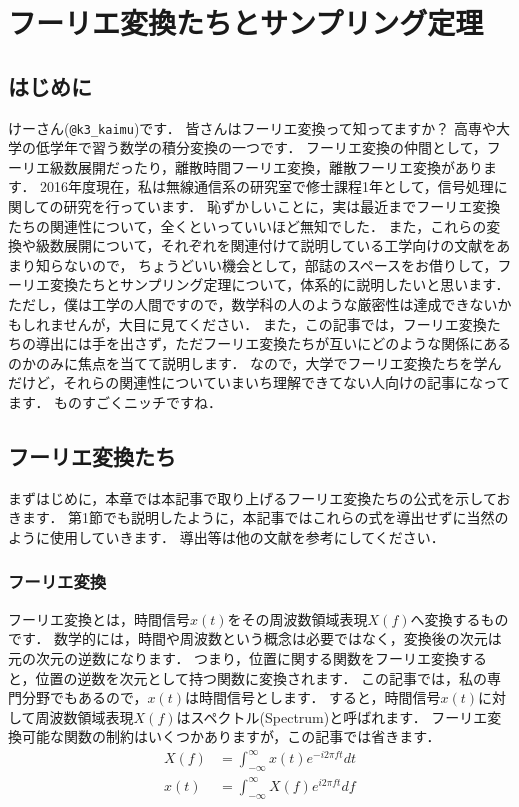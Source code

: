 \chapter{フーリエ変換たちとサンプリング定理}

\section{はじめに}

けーさん(\verb|@k3_kaimu|)です．
皆さんはフーリエ変換って知ってますか？
高専や大学の低学年で習う数学の積分変換の一つです．
フーリエ変換の仲間として，フーリエ級数展開だったり，離散時間フーリエ変換，離散フーリエ変換があります．
2016年度現在，私は無線通信系の研究室で修士課程1年として，信号処理に関しての研究を行っています．
恥ずかしいことに，実は最近までフーリエ変換たちの関連性について，全くといっていいほど無知でした．
また，これらの変換や級数展開について，それぞれを関連付けて説明している工学向けの文献をあまり知らないので，
ちょうどいい機会として，部誌のスペースをお借りして，フーリエ変換たちとサンプリング定理について，体系的に説明したいと思います．
ただし，僕は工学の人間ですので，数学科の人のような厳密性は達成できないかもしれませんが，大目に見てください．
また，この記事では，フーリエ変換たちの導出には手を出さず，ただフーリエ変換たちが互いにどのような関係にあるのかのみに焦点を当てて説明します．
なので，大学でフーリエ変換たちを学んだけど，それらの関連性についていまいち理解できてない人向けの記事になってます．
ものすごくニッチですね．

\section{フーリエ変換たち}

まずはじめに，本章では本記事で取り上げるフーリエ変換たちの公式を示しておきます．
第1節でも説明したように，本記事ではこれらの式を導出せずに当然のように使用していきます．
導出等は他の文献を参考にしてください．

\subsection{フーリエ変換}

フーリエ変換とは，時間信号$x(t)$をその周波数領域表現$X(f)$へ変換するものです．
数学的には，時間や周波数という概念は必要ではなく，変換後の次元は元の次元の逆数になります．
つまり，位置に関する関数をフーリエ変換すると，位置の逆数を次元として持つ関数に変換されます．
この記事では，私の専門分野でもあるので，$x(t)$は時間信号とします．
すると，時間信号$x(t)$に対して周波数領域表現$X(f)$はスペクトル(Spectrum)と呼ばれます．
フーリエ変換可能な関数の制約はいくつかありますが，この記事では省きます．
\begin{align}
X(f) &= \int_{-\infty}^{\infty} x(t) e^{-i2\pi f t} dt \\
x(t) &= \int_{-\infty}^{\infty} X(f) e^{i2\pi ft} df
\end{align}

